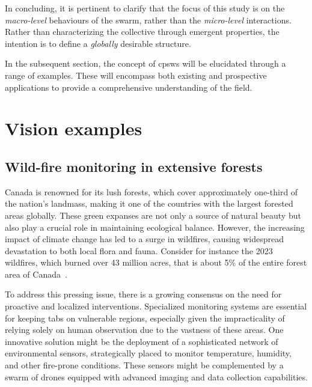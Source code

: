In concluding, 
 it is pertinent to clarify that the focus of this study is on the \textit{macro-level} behaviours of the swarm, 
 rather than the \textit{micro-level} interactions. 
 Rather than characterizing the collective through emergent properties, 
 the intention is to define a \emph{globally} desirable structure.

% 

In the subsequent section, 
 the concept of \acp{cpsw} will be elucidated through a range of examples. 
 These will encompass both existing and prospective applications to provide a comprehensive understanding of the field.
\section{Vision examples}\label{chap:cpsw:vision}
\subsection{Wild-fire monitoring in extensive forests}
Canada is renowned for its lush forests, 
 which cover approximately one-third of the nation's landmass, 
 making it one of the countries with the largest forested areas globally. 
These green expanses are not only a source of natural beauty but also play a crucial role in maintaining ecological balance. 
 However, the increasing impact of climate change has led to a surge in wildfires, 
 causing widespread devastation to both local flora and fauna.
 Consider for instance the 2023 wildfires, 
 which burned over 43 million acres, 
 that is about 5\% of the entire forest area of Canada~\cite{enwiki:1178342069}. 

To address this pressing issue, 
 there is a growing consensus on the need for proactive and localized interventions. 
 Specialized monitoring systems are essential for keeping tabs on vulnerable regions, 
 especially given the impracticality of relying solely on human observation due to the vastness of these areas. 
 One innovative solution might be the deployment of a sophisticated network of environmental sensors, strategically placed to monitor temperature, humidity, and other fire-prone conditions. 
 These sensors might be complemented by a swarm of drones equipped with advanced imaging and data collection capabilities.

